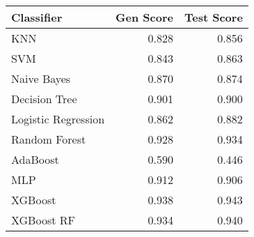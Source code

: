 \begin{tabular}{lrr}
\toprule
Classifier & Gen Score & Test Score \\
\midrule
KNN & 0.828 & 0.856 \\
SVM & 0.843 & 0.863 \\
Naive Bayes & 0.870 & 0.874 \\
Decision Tree & 0.901 & 0.900 \\
Logistic Regression & 0.862 & 0.882 \\
Random Forest & 0.928 & 0.934 \\
AdaBoost & 0.590 & 0.446 \\
MLP & 0.912 & 0.906 \\
XGBoost & 0.938 & 0.943 \\
XGBoost RF & 0.934 & 0.940 \\
\bottomrule
\end{tabular}
